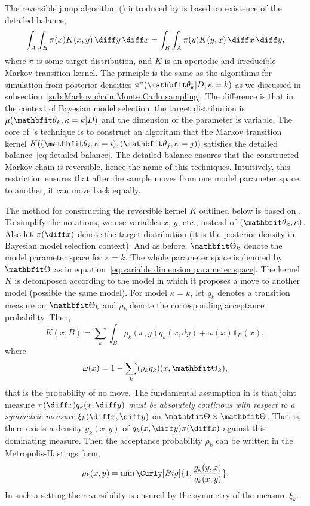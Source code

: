 The reversible jump \mcmc algorithm (\rjmcmc) introduced by
\textcite{Green:1995dg} is based on existence of the detailed balance,
\begin{equation}
  \int_A\int_B\pi(x)K(x,y)\intd y \intd x =
  \int_B\int_A\pi(y)K(y,x)\intd x \intd y,
  \label{eq:detailed balance}
\end{equation}
where $\pi$ is some target distribution, and $K$ is an aperiodic and
irreducible Markov transition kernel. The principle is the same as the \mcmc
algorithms for simulation from posterior densities $\pi^*(\bth_k|D,\kappa =
k)$ as we discussed in subsection~\ref{sub:Markov chain Monte Carlo sampling}.
The difference is that in the context of Bayesian model selection, the target
distribution is $\mu(\bth_k,\kappa = k|D)$ and the dimension of the parameter
is variable. The core of \textcite{Green:1995dg}'s technique is to construct
an algorithm that the Markov transition kernel $K((\bth_i,\kappa = i),
(\bth_j,\kappa = j))$ satisfies the detailed balance~\eqref{eq:detailed
  balance}. The detailed balance ensures that the constructed Markov chain is
reversible, hence the name of this techniques. Intuitively, this restriction
ensures that after the sample moves from one model parameter space to another,
it can move back equally.

The method for constructing the reversible kernel $K$ outlined below is based
on \textcite[][chap.~11]{Robert:2004tn}. To simplify the notations, we use
variables $x$, $y$, etc., instead of $(\bth_{\kappa}, \kappa)$. Also let
$\pi(\diff x)$ denote the target distribution (it is the posterior density in
Bayesian model selection context). And as before, $\bTh_k$ denote the model
parameter space for $\kappa = k$. The whole parameter space is denoted by
$\bTh$ as in equation~\eqref{eq:variable dimension parameter space}. The
kernel $K$ is decomposed according to the model in which it proposes a move to
another model (possible the same model). For model $\kappa=k$, let $q_k$
denotes a transition measure on $\bTh_k$ and $\rho_k$ denote the corresponding
acceptance probability. Then,
\begin{equation}
  K(x,B) = \sum_k\int_B\rho_k(x,y)q_k(x,dy)+\omega(x)\mathbb{1}_B(x),
\end{equation}
where
\begin{equation}
  \omega(x) = 1 - \sum_k(\rho_k q_k)(x,\bTh_k),
\end{equation}
that is the probability of no move. The fundamental assumption in
\textcite{Green:1995dg} is that joint measure $\pi(\diff x)q_k(x,\diff y)$
\emph{must be absolutely continous with respect to a symmetric measure}
$\xi_k(\diff x, \diff y)$ on $\bTh\times\bTh$. That is, there exists a density
$g_k(x,y)$ of $q_k(x,\diff y)\pi(\diff x)$ against this dominating measure.
Then the acceptance probability $\rho_k$ can be written in the
Metropolis-Hastings form,
\begin{equation}
  \rho_k(x,y) = \min\Curly[Big]{1,\frac{g_k(y,x)}{g_k(x,y)}}.
\end{equation}
In such a setting the reversibility is ensured by the symmetry of the measure
$\xi_k$.

